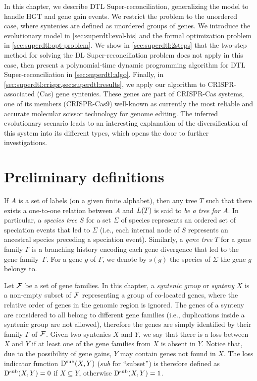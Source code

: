 In this chapter, we describe DTL Super-reconciliation, generalizing the model to handle HGT and gene gain events.
We restrict the problem to the unordered case, where syntenies are defined as unordered groups of genes.
We introduce the evolutionary model in \cref{sec:superdtl:evol-his} and the formal optimization problem in \cref{sec:superdtl:opt-problem}.
We show in \cref{sec:superdtl:2steps} that the two-step method for solving the DL Super-reconciliation problem does not apply in this case, then present a polynomial-time dynamic programming algorithm for DTL Super-reconciliation in \cref{sec:superdtl:algo}.
Finally, in \cref{sec:superdtl:crispr,sec:superdtl:results}, we apply our algorithm to CRISPR-associated (Cas) gene syntenies.
These genes are part of CRISPR-Cas systems, one of its members (CRISPR-Cas9) well-known as currently the most reliable and accurate molecular scissor technology for genome editing.
The inferred evolutionary scenario leads to an interesting explanation of the diversification of this system into its different types, which opens the door to further investigations.

\section{Preliminary definitions}

If \(A\) is a set of labels (on a given finite alphabet), then any tree \(T\) such that there exists a
one-to-one relation between \(A\) and \(L(T)\) is said to \emph{be a tree for
\(A\)}. In particular, a \emph{species tree} \(S\) for a set \(\Sigma\) of
species represents an ordered set of speciation events that led to
\(\Sigma\) (i.e., each internal node of \(S\) represents an ancestral species preceding a speciation event).
Similarly, a \emph{gene tree} \(T\) for a gene family \(\Gamma\) is a
branching history encoding each gene divergence that led to the gene
family~\(\Gamma\). For a gene \(g\) of \(\Gamma\), we denote by \(s(g)\) the
species of \(\Sigma\) the gene \(g\) belongs to.

Let \(\mathcal{F}\) be a set of gene families. In this chapter, a \emph{syntenic group} or \emph{synteny} \(X\) is a non-empty subset of \(\mathcal{F}\) representing a group of co-located genes, where the relative order of genes in the genomic region is ignored.
The genes of a synteny are considered to all belong to different gene families (i.e., duplications inside a syntenic group are not allowed),
therefore the genes are simply identified by their family \(\Gamma\) of \(\mathcal{F}\).
Given two syntenies \(X\) and \(Y\), we say that there is a loss between \(X\) and \(Y\) if at least one of the gene families from \(X\) is absent in \(Y\). Notice that, due to the possibility of gene gains, \(Y\) may contain genes not found in \(X\).
The loss indicator function \(\mathrm{D}^\mathrm{sub}(X, Y)\) (\(sub\) for \enquote{subset}) is therefore defined as \(\mathrm{D}^\mathrm{sub}(X, Y) = 0\) if \(X \subseteq Y\), otherwise \(\mathrm{D}^\mathrm{sub}(X, Y) = 1\).


